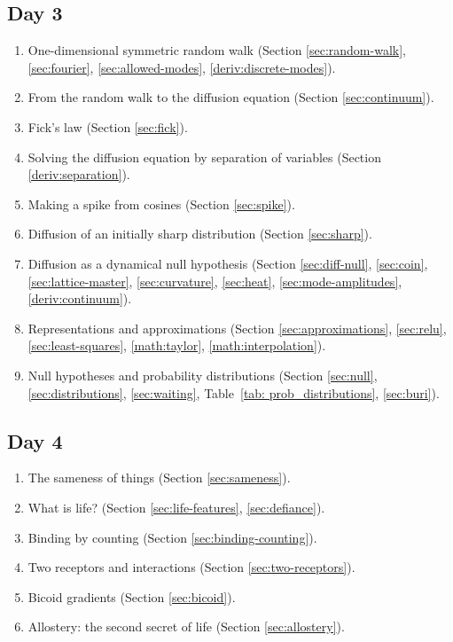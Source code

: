 \subsection{Day 3}
\begin{enumerate}
    \item One-dimensional symmetric random walk (Section \ref{sec:random-walk}, \ref{sec:fourier}, \ref{sec:allowed-modes}, \ref{deriv:discrete-modes}).
    \item From the random walk to the diffusion equation (Section \ref{sec:continuum}).
    \item Fick's law (Section \ref{sec:fick}).
    \item Solving the diffusion equation by separation of variables (Section \ref{deriv:separation}).
    \item Making a spike from cosines (Section \ref{sec:spike}).
    \item Diffusion of an initially sharp distribution (Section \ref{sec:sharp}).
    \item Diffusion as a dynamical null hypothesis (Section \ref{sec:diff-null}, \ref{sec:coin}, \ref{sec:lattice-master}, \ref{sec:curvature}, \ref{sec:heat}, \ref{sec:mode-amplitudes}, \ref{deriv:continuum}).
    \item Representations and approximations (Section \ref{sec:approximations}, \ref{sec:relu}, \ref{sec:least-squares}, \ref{math:taylor}, \ref{math:interpolation}).
    \item Null hypotheses and probability distributions (Section \ref{sec:null}, \ref{sec:distributions}, \ref{sec:waiting}, Table~\ref{tab: prob_distributions}, \ref{sec:buri}).
\end{enumerate}
\subsection{Day 4}
\begin{enumerate}
    \item The sameness of things (Section \ref{sec:sameness}).
    \item What is life? (Section \ref{sec:life-features}, 
    \ref{sec:defiance}).
    \item Binding by counting (Section \ref{sec:binding-counting}).
    \item Two receptors and interactions (Section \ref{sec:two-receptors}).
    \item Bicoid gradients (Section \ref{sec:bicoid}).
    \item Allostery: the second secret of life (Section \ref{sec:allostery}).
\end{enumerate}
